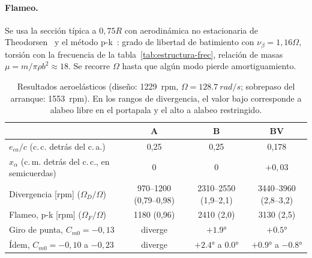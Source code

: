 \paragraph{Flameo.} Se usa la sección típica a $0{,}75R$ con aerodinámica no estacionaria
de Theodorsen~\cite{estructura-theodorsen1935} y el método p-k~\cite{estructura-hodges2011}:
grado de libertad de batimiento con $\nu_\beta=1{,}16\Omega$, torsión con la frecuencia de
la tabla~\ref{tab:estructura-frec}, relación de masas $\mu=m/\pi\rho b^2\approx18$. Se
recorre $\Omega$ hasta que algún modo pierde amortiguamiento.

\begin{table}[H]
\centering\small
\footnotesize
\caption{Resultados aeroelásticos (diseño: \SI{1229}{rpm}, $\Omega=\SI{128.7}{rad/s}$; sobrepaso
del arranque: \SI{1553}{rpm}). En los rangos de divergencia, el valor bajo corresponde a alabeo
libre en el portapala y el alto a alabeo restringido.}\label{tab:estructura-aeroel}
\setlength{\tabcolsep}{4pt}
\begin{tabular}{@{}lccc@{}}
\toprule
 & \textbf{A} & \textbf{B} & \textbf{BV}\\\midrule
$e_{ca}/c$ (c.\,c. detrás del c.\,a.) & 0,25 & 0,25 & 0,178\\
$x_\alpha$ (c.\,m. detrás del c.\,c., en semicuerdas) & 0 & 0 & $+0{,}03$\\
Divergencia [rpm] ($\Omega_D/\Omega$) & 970--1200 (0,79--0,98) & 2310--2550 (1,9--2,1) & 3440--3960 (2,8--3,2)\\
Flameo, p-k [rpm] ($\Omega_F/\Omega$) & 1180 (0,96) & 2410 (2,0) & 3130 (2,5)\\
Giro de punta, $C_{m0}=-0{,}13$ & diverge & $+\ang{1.9}$ & $+\ang{0.5}$\\
Ídem, $C_{m0}=-0{,}10$ a $-0{,}23$ & diverge & $+\ang{2.4}$ a $\ang{0.0}$ & $+\ang{0.9}$ a $\ang{-0.8}$\\
\bottomrule
\end{tabular}
\end{table}

